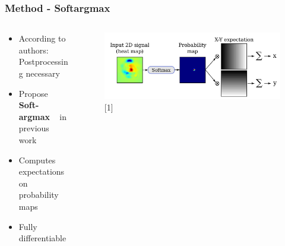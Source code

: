 \documentclass[9pt]{beamer}
\providecommand{\sourcefix}[1]{\\ \footnotesize \tugreen{Source:} [#1]}
\renewcommand{\caption}[1]{\\ \footnotesize{\captiongrey{#1}}}
\newenvironment{myframe}[1][]{%
\begin{frame}%
\frametitle{#1}
\setcounter{footnote}{0}


}{%
\end{frame}%
}
\begin{document}
\begin{myframe}[Method - Softargmax]
	\begin{columns}[T]
        \begin{column}{.45\textwidth}
            \begin{itemize}
                \item According to authors: Postprocessing necessary
                \item Propose \textbf{Soft-argmax} \footnotemark ~ in previous work
                \item Computes expectations on probability maps
                \item Fully differentiable
            \end{itemize}
        \end{column}
        \begin{column}{.45\textwidth}
            \begin{figure}
                \includegraphics[width=.99\textwidth]{softargmax.png}
                \sourcefix{1}
            \end{figure}
        \end{column}
	\end{columns}
\end{myframe}
\end{document}
